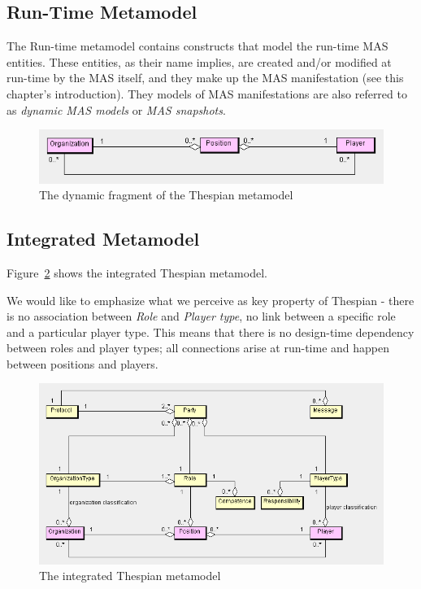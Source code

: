 \subsection{Run-Time Metamodel}

The Run-time metamodel contains constructs that model the run-time MAS entities.
These entities, as their name implies, are created and/or modified at run-time by the MAS itself, and they make up the MAS manifestation (see this chapter's introduction).
They models of MAS manifestations are also referred to as \textit{dynamic MAS models} or \textit{MAS snapshots}.

\begin{figure}[ht]
	\centering
	\includegraphics[width=\textwidth]{images/thespian/run-time-metamodel.png}
	\caption{The dynamic fragment of the Thespian metamodel}
	\label{figure:thespian-dynamic-metamodel}
\end{figure}

\subsection{Integrated Metamodel}

Figure~\ref{figure:thespian-integrated-metamodel} shows the integrated Thespian metamodel.

We would like to emphasize what we perceive as key property of Thespian - there is no association between \textit{Role} and \textit{Player type}, no link between a specific role and a particular player type.
This means that there is no design-time dependency between roles and player types; all connections arise at run-time and happen between positions and players.

\begin{figure}[ht]
	\centering
	\includegraphics[width=\textwidth]{images/thespian/integrated-metamodel.png}
	\caption{The integrated Thespian metamodel}
	\label{figure:thespian-integrated-metamodel}
\end{figure}